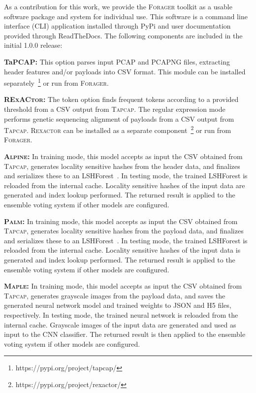 As a contribution for this work, we provide the \textsc{Forager} toolkit as a usable software package and system for individual use. This software is a command line interface (CLI) application installed through PyPi and user documentation provided through ReadTheDocs. The following components are included in the initial 1.0.0 release:

\medskip

\textbf{TaPCAP: } This option parses input PCAP and PCAPNG files, extracting header features and/or payloads into CSV format. This module can be installed separately~\footnote{https://pypi.org/project/tapcap/} or run from \textsc{Forager}.

\textbf{\textsc{RExACtor}: } The token option finds frequent tokens according to a provided threshold from a CSV output from \textsc{Tapcap}. The regular expression mode performs genetic sequencing alignment of payloads from a CSV output from \textsc{Tapcap}. \textsc{Rexactor} can be installed as a separate component~\footnote{https://pypi.org/project/rexactor/} or run from \textsc{Forager}.

\textbf{\textsc{Alpine}: } In training mode, this model accepts as input the CSV obtained from \textsc{Tapcap}, generates locality sensitive hashes from the header data, and finalizes and serializes these to an LSHForest~\cite{lshforest}. In testing mode, the trained LSHForest is reloaded from the internal cache. Locality sensitive hashes of the input data are generated and index lookup performed. The returned result is applied to the ensemble voting system if other models are configured.

\textbf{\textsc{Palm}: } In training mode, this model accepts as input the CSV obtained from \textsc{Tapcap}, generates locality sensitive hashes from the payload data, and finalizes and serializes these to an LSHForest~\cite{lshforest}. In testing mode, the trained LSHForest is reloaded from the internal cache. Locality sensitive hashes of the input data is generated and index lookup performed. The returned result is applied to the ensemble voting system if other models are configured.

\textbf{\textsc{Maple}: } In training mode, this model accepts as input the CSV obtained from \textsc{Tapcap}, generates grayscale images from the payload data, and saves the generated neural network model and trained weights to JSON and H5 files, respectively. In testing mode, the trained neural network is reloaded from the internal cache. Grayscale images of the input data are generated and used as input to the CNN classifier. The returned result is then applied to the ensemble voting system if other models are configured.

